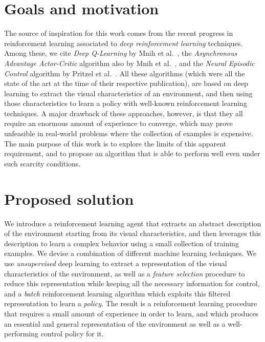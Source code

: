 \section{Goals and motivation}
The source of inspiration for this work comes from the recent progress in 
reinforcement learning associated to \textit{deep reinforcement learning} 
techniques. 
Among these, we cite \textit{Deep Q-Learning} by Mnih et al.\ \cite{mnih2015human},
the \textit{Asynchronous Advantage Actor-Critic} algorithm also by Mnih et 
al.\ \cite{mnih2016asynchronous}, and the \textit{Neural Episodic Control} 
algorithm by Pritzel et al.\ \cite{pritzel2017neural}.
All these algorithms (which were all the state of the art at the time of
their respective publication), are based on deep learning to extract 
the visual characteristics of an environment, and then using those 
characteristics to learn a policy with well-known reinforcement learning 
techniques. A major drawback of these approaches, however, is that they all 
require an enormous amount of experience to converge, which may prove unfeasible
in real-world problems where the collection of examples is expensive.
The main purpose of this work is to explore the limits of this apparent 
requirement, and to propose an algorithm that is able to perform well even under 
such scarcity conditions.

\section{Proposed solution}
We introduce a reinforcement learning agent that extracts an abstract 
description of the environment starting from its visual characteristics, and 
then leverages this description to learn a complex behavior using a small 
collection of training examples.
We devise a combination of different machine learning techniques. We use 
\textit{unsupervised} deep learning to extract a representation of the visual 
characteristics of the environment, as well as a \textit{feature selection}
procedure to reduce this representation while keeping all the necessary 
information for control, and a \textit{batch} reinforcement learning algorithm 
which exploits this filtered representation to learn a \textit{policy}.
The result is a reinforcement learning procedure that requires a small amount
of experience in order to learn, and which produces an essential and 
general representation of the environment as well as a well-performing control 
policy for it.

